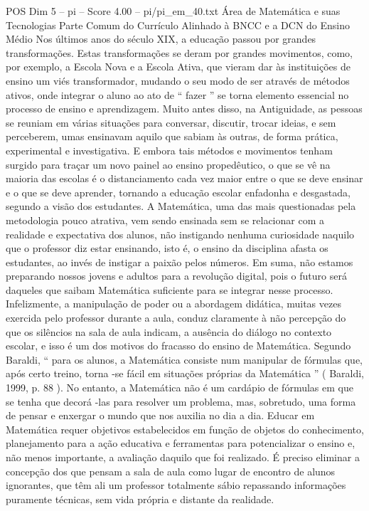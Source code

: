 \begin{textsample}{POS Dim 5 – pi – Score 4.00 – pi/pi\_em\_40.txt}  \label{ex:f5_pos_237}
Área de Matemática e suas Tecnologias Parte Comum do Currículo Alinhado à BNCC e a DCN do Ensino Médio Nos últimos anos do século XIX, a educação passou por grandes transformações.
Estas transformações se deram por grandes movimentos, como, por exemplo, a Escola Nova e a Escola Ativa, que vieram dar às instituições de ensino um viés transformador, mudando o seu modo de ser através de métodos ativos, onde integrar o aluno ao ato de “ fazer ” se torna elemento essencial no processo de ensino e aprendizagem.
Muito antes disso, na Antiguidade, as pessoas se reuniam em várias situações para conversar, discutir, trocar ideias, e sem perceberem, umas ensinavam aquilo que sabiam às outras, de forma prática, experimental e investigativa.
E embora tais métodos e movimentos tenham surgido para traçar um novo painel ao ensino propedêutico, o que se vê na maioria das escolas é o distanciamento cada vez maior entre o que se deve ensinar e o que se deve aprender, tornando a educação escolar enfadonha e desgastada, segundo a visão dos estudantes.
A Matemática, uma das mais questionadas pela metodologia pouco atrativa, vem sendo ensinada sem se relacionar com a realidade e expectativa dos alunos, não instigando nenhuma curiosidade naquilo que o professor diz estar ensinando, isto é, o ensino da disciplina afasta os estudantes, ao invés de instigar a paixão pelos números.
Em suma, não estamos preparando nossos jovens e adultos para a revolução digital, pois o futuro será daqueles que saibam Matemática suficiente para se integrar nesse processo.
Infelizmente, a manipulação de poder ou a abordagem didática, muitas vezes exercida pelo professor durante a aula, conduz claramente à não percepção do que os silêncios na sala de aula indicam, a ausência do diálogo no contexto escolar, e isso é um dos motivos do fracasso do ensino de Matemática.
Segundo Baraldi, “ para os alunos, a Matemática consiste num manipular de fórmulas que, após certo treino, torna -se fácil em situações próprias da Matemática ” ( Baraldi, 1999, p. 88 ).
No entanto, a Matemática não é um cardápio de fórmulas em que se tenha que decorá -las para resolver um problema, mas, sobretudo, uma forma de pensar e enxergar o mundo que nos auxilia no dia a dia.
Educar em Matemática requer objetivos estabelecidos em função de objetos do conhecimento, planejamento para a ação educativa e ferramentas para potencializar o ensino e, não menos importante, a avaliação daquilo que foi realizado.
É preciso eliminar a concepção dos que pensam a sala de aula como lugar de encontro de alunos ignorantes, que têm ali um professor totalmente sábio repassando informações puramente técnicas, sem vida própria e distante da realidade.

\end{textsample}
